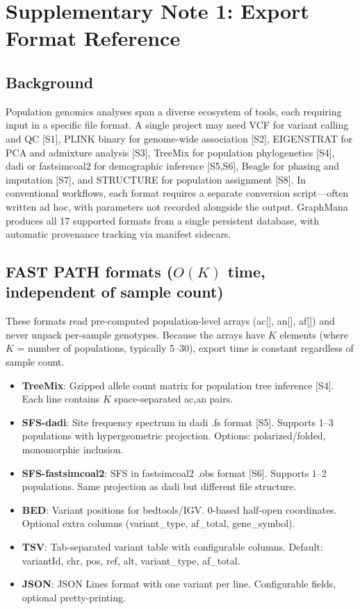 \documentclass[11pt,a4paper]{article}
\begin{document}
\section{Supplementary Note 1: Export Format Reference}

\subsection*{Background}

Population genomics analyses span a diverse ecosystem of tools, each requiring input in a specific file format. A single project may need VCF for variant calling and QC [S1], PLINK binary for genome-wide association [S2], EIGENSTRAT for PCA and admixture analysis [S3], TreeMix for population phylogenetics [S4], dadi or fastsimcoal2 for demographic inference [S5,S6], Beagle for phasing and imputation [S7], and STRUCTURE for population assignment [S8]. In conventional workflows, each format requires a separate conversion script---often written ad hoc, with parameters not recorded alongside the output. GraphMana produces all 17 supported formats from a single persistent database, with automatic provenance tracking via manifest sidecars.

\subsection*{FAST PATH formats ($O(K)$ time, independent of sample count)}

These formats read pre-computed population-level arrays (ac[], an[], af[]) and never unpack per-sample genotypes. Because the arrays have $K$ elements (where $K$ = number of populations, typically 5--30), export time is constant regardless of sample count.

\begin{itemize}
\item \textbf{TreeMix}: Gzipped allele count matrix for population tree inference [S4]. Each line contains $K$ space-separated ac,an pairs.
\item \textbf{SFS-dadi}: Site frequency spectrum in dadi .fs format [S5]. Supports 1--3 populations with hypergeometric projection. Options: polarized/folded, monomorphic inclusion.
\item \textbf{SFS-fastsimcoal2}: SFS in fastsimcoal2 .obs format [S6]. Supports 1--2 populations. Same projection as dadi but different file structure.
\item \textbf{BED}: Variant positions for bedtools/IGV. 0-based half-open coordinates. Optional extra columns (variant\_type, af\_total, gene\_symbol).
\item \textbf{TSV}: Tab-separated variant table with configurable columns. Default: variantId, chr, pos, ref, alt, variant\_type, af\_total.
\item \textbf{JSON}: JSON Lines format with one variant per line. Configurable fields, optional pretty-printing.
\end{itemize}
\end{document}

